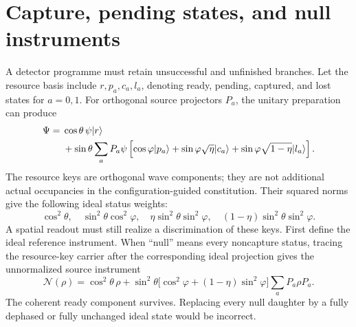 \section{Capture, pending states, and null instruments}\label{section:massive:capture-pending-states-and-null-instruments}
A detector programme must retain unsuccessful and unfinished branches. Let the resource basis include $r,p_a,c_a,l_a$, denoting ready, pending, captured, and lost states for $a=0,1$. For orthogonal source projectors $P_a$, the unitary preparation can produce
\begin{align}\label{eq:resource-wave}
\Psi={}&\cos\theta\,\psi\lvert r\rangle\nonumber\\
&+\sin\theta\sum_aP_a\psi\left[
\cos\varphi\lvert p_a\rangle+\sin\varphi\sqrt\eta\lvert c_a\rangle
+\sin\varphi\sqrt{1-\eta}\lvert l_a\rangle\right].
\end{align}
The resource keys are orthogonal wave components; they are not additional actual occupancies in the configuration-guided constitution. Their squared norms give the following ideal status weights:
\[
\cos^2\theta,\quad
\sin^2\theta\cos^2\varphi,\quad
\eta\sin^2\theta\sin^2\varphi,\quad
(1-\eta)\sin^2\theta\sin^2\varphi.
\]
A spatial readout must still realize a discrimination of these keys. First define the ideal reference instrument. When ``null'' means every noncapture status, tracing the resource-key carrier after the corresponding ideal projection gives the unnormalized source instrument
\begin{equation}\label{eq:nullinstrument}
\mathcal N(\rho)=\cos^2\theta\,\rho+
\sin^2\theta\bigl[\cos^2\varphi+(1-\eta)\sin^2\varphi\bigr]
\sum_aP_a\rho P_a.
\end{equation}
The coherent ready component survives. Replacing every null daughter by a fully dephased or fully unchanged ideal state would be incorrect.

